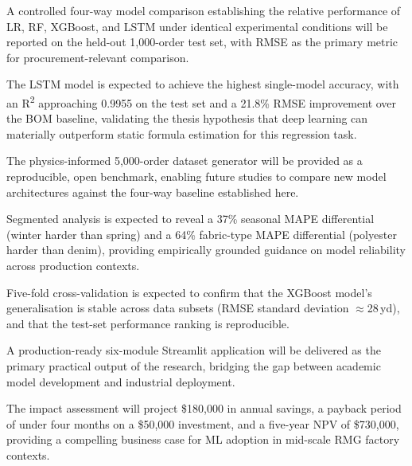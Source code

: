 A controlled four-way model comparison establishing the relative performance of LR, RF, XGBoost, and LSTM under identical experimental conditions will be reported on the held-out 1{,}000-order test set, with RMSE as the primary metric for procurement-relevant comparison.

The LSTM model is expected to achieve the highest single-model accuracy, with an R\textsuperscript{2} approaching 0.9955 on the test set and a 21.8\% RMSE improvement over the BOM baseline, validating the thesis hypothesis that deep learning can materially outperform static formula estimation for this regression task.

The physics-informed 5{,}000-order dataset generator will be provided as a reproducible, open benchmark, enabling future studies to compare new model architectures against the four-way baseline established here.

Segmented analysis is expected to reveal a 37\% seasonal MAPE differential (winter harder than spring) and a 64\% fabric-type MAPE differential (polyester harder than denim), providing empirically grounded guidance on model reliability across production contexts.

Five-fold cross-validation is expected to confirm that the XGBoost model's generalisation is stable across data subsets (RMSE standard deviation $\approx$28\,yd), and that the test-set performance ranking is reproducible.

A production-ready six-module Streamlit application will be delivered as the primary practical output of the research, bridging the gap between academic model development and industrial deployment.

The impact assessment will project \$180{,}000 in annual savings, a payback period of under four months on a \$50{,}000 investment, and a five-year NPV of \$730{,}000, providing a compelling business case for ML adoption in mid-scale RMG factory contexts.

\secdiv
